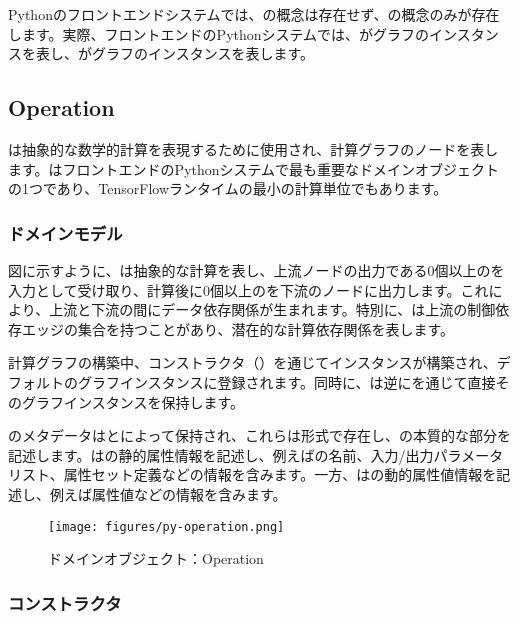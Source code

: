 \begin{content}

Pythonのフロントエンドシステムでは、の概念は存在せず、の概念のみが存在します。実際、フロントエンドのPythonシステムでは、がグラフのインスタンスを表し、がグラフのインスタンスを表します。

\subsection{Operation}

は抽象的な数学的計算を表現するために使用され、計算グラフのノードを表します。はフロントエンドのPythonシステムで最も重要なドメインオブジェクトの1つであり、TensorFlowランタイムの最小の計算単位でもあります。

\subsubsection{ドメインモデル}

図に示すように、は抽象的な計算を表し、上流ノードの出力である0個以上のを入力として受け取り、計算後に0個以上のを下流のノードに出力します。これにより、上流と下流の間にデータ依存関係が生まれます。特別に、は上流の制御依存エッジの集合を持つことがあり、潜在的な計算依存関係を表します。

計算グラフの構築中、コンストラクタ（）を通じてインスタンスが構築され、デフォルトのグラフインスタンスに登録されます。同時に、は逆にを通じて直接そのグラフインスタンスを保持します。

のメタデータはとによって保持され、これらは形式で存在し、の本質的な部分を記述します。はの静的属性情報を記述し、例えばの名前、入力/出力パラメータリスト、属性セット定義などの情報を含みます。一方、はの動的属性値情報を記述し、例えば属性値などの情報を含みます。

\begin{figure}[H]
\centering
\texttt{[image: figures/py-operation.png]}
\caption{ドメインオブジェクト：Operation}
 \label{fig:py-operation}
\end{figure}

\subsubsection{コンストラクタ}


\end{content}
